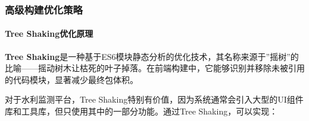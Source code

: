 \begin{Shaded}
\begin{Highlighting}[]
      \ExtensionTok{//}
      \NormalTok{ = \{}
         \NormalTok{,}
        \NormalTok{ \{}
          \NormalTok{ \{}
             \NormalTok{,}
            \NormalTok{ /}\PreprocessorTok{[}\DataTypeTok{\textbackslash{}\textbackslash{}}\SpecialStringTok{/}\PreprocessorTok{]}\PreprocessorTok{[}\DataTypeTok{\textbackslash{}\textbackslash{}}\SpecialStringTok{/}\PreprocessorTok{]}\NormalTok{/,}
          \ErrorTok{\}}\ExtensionTok{,}
          \ExtensionTok{//}
          \NormalTok{ \{}
             \NormalTok{,}
            \NormalTok{ /}\PreprocessorTok{[}\DataTypeTok{\textbackslash{}\textbackslash{}}\SpecialStringTok{/}\PreprocessorTok{]}\PreprocessorTok{[}\DataTypeTok{\textbackslash{}\textbackslash{}}\SpecialStringTok{/}\PreprocessorTok{]}\PreprocessorTok{[}\DataTypeTok{\textbackslash{}\textbackslash{}}\SpecialStringTok{/}\PreprocessorTok{]}
          \ErrorTok{\}}
        \ErrorTok{\}}
      \ErrorTok{\}}
    \ErrorTok{\}}
  \ErrorTok{\}}
\ErrorTok{\}}
\end{Highlighting}
\end{Shaded}

\subsubsection{高级构建优化策略}\label{ux9ad8ux7ea7ux6784ux5efaux4f18ux5316ux7b56ux7565}

\paragraph{Tree Shaking优化原理}\label{tree-shakingux4f18ux5316ux539fux7406}

\textbf{Tree Shaking}是一种基于ES6模块静态分析的优化技术，其名称来源于''摇树''的比喻------摇动树木让枯死的叶子掉落。在前端构建中，它能够识别并移除未被引用的代码模块，显著减少最终包体积。

对于水利监测平台，Tree Shaking特别有价值，因为系统通常会引入大型的UI组件库和工具库，但只使用其中的一部分功能。通过Tree Shaking，可以实现：

